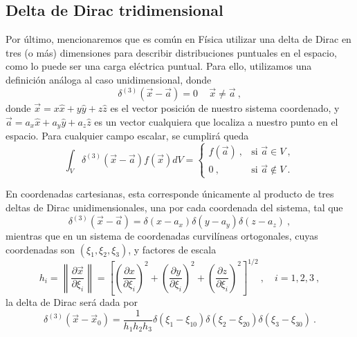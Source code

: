 \subsection{Delta de Dirac tridimensional}

Por último, mencionaremos que es común en Física utilizar una delta de Dirac en tres (o más) dimensiones para describir distribuciones puntuales en el espacio, como lo puede ser una carga eléctrica puntual. Para ello, utilizamos una definición análoga al caso unidimensional, donde
\begin{equation}
    \delta^{(3)}(\vec{x}-\vec{a}) = 0 \, \quad \vec{x} \neq \vec{a} \ ,
\end{equation}
donde $\vec{x} = x \hat{x} + y \hat{y} + z\hat{z}$ es el vector posición de nuestro sistema coordenado, y $\vec{a} = a_x \hat{x} + a_y \hat{y} + a_z \hat{z}$ es un vector cualquiera que localiza a nuestro punto en el espacio. Para cualquier campo escalar, se cumplirá queda
\begin{equation}
    \int_V \delta^{(3)} (\vec{x}-\vec{a}) f(\vec{x}) dV = \left\{\begin{array}{cc}
        f(\vec{a}) \ , & \text{si } \vec{a} \in V \ , \\
        0 \ , & \text{si } \vec{a} \notin V \ .
    \end{array}\right.
\end{equation}

En coordenadas cartesianas, esta corresponde únicamente al producto de tres deltas de Dirac unidimensionales, una por cada coordenada del sistema, tal que
\begin{equation}
    \delta^{(3)}(\vec{x} - \vec{a}) = \delta(x-a_x) \delta(y - a_y) \delta(z - a_z) \ ,
\end{equation}
mientras que en un sistema de coordenadas curvilíneas ortogonales, cuyas coordenadas son $(\xi_1, \xi_2, \xi_3)$, y factores de escala 
\begin{equation}
    h_i = \left\| \frac{\partial \vec{x}}{\partial \xi_i} \right\| = \left[ \left( \frac{\partial x}{\partial \xi_i} \right)^2 + \left( \frac{\partial y}{\partial \xi_i} \right)^2 + \left( \frac{\partial z}{\partial \xi_i} \right)^2 \right]^{1/2} \ , \quad i = 1, 2, 3 \ ,
\end{equation}
la delta de Dirac será dada por
\begin{equation}
    \delta^{(3)}(\vec{x}-\vec{x}_0) = \frac{1}{h_1 h_2 h_3} \delta(\xi_1 - \xi_{10}) \delta(\xi_2 - \xi_{20}) \delta(\xi_3 - \xi_{30}) \ .
\end{equation}

